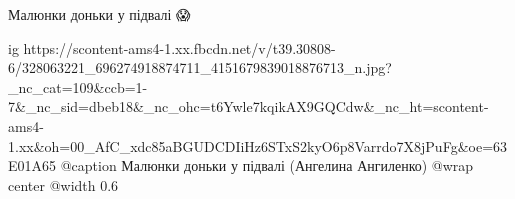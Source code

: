  
 
 
 
 


Малюнки доньки у підвалі 😱

\ifcmt
  ig https://scontent-ams4-1.xx.fbcdn.net/v/t39.30808-6/328063221_696274918874711_4151679839018876713_n.jpg?_nc_cat=109&ccb=1-7&_nc_sid=dbeb18&_nc_ohc=t6Ywle7kqikAX9GQCdw&_nc_ht=scontent-ams4-1.xx&oh=00_AfC_xdc85aBGUDCDIiHz6STxS2kyO6p8Varrdo7X8jPuFg&oe=63E01A65
  @caption Малюнки доньки у підвалі (Ангелина Ангиленко)
  @wrap center
  @width 0.6
\fi
